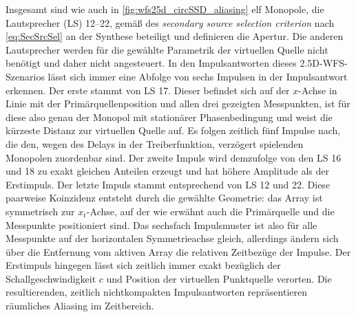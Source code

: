 Insgesamt sind wie auch in \Abb\ref{fig:wfs25d_circSSD_aliasing} elf Monopole, die
Lautsprecher (LS) 12--22, gemäß des \textit{secondary source selection criterion}
nach \Glg\eqref{eq:SecSrcSel} an der Synthese beteiligt und definieren die Apertur.
%
Die anderen Lautsprecher werden für die gewählte Parametrik der virtuellen Quelle
nicht benötigt und daher nicht angesteuert.
%
In den Impulsantworten dieses 2.5D-WFS-Szenarios lässt sich immer eine Abfolge von
sechs Impulsen in der Impulsantwort erkennen.
%
Der erste stammt von LS 17.
%
Dieser befindet sich auf der $x$-Achse in Linie mit der
Primärquellenposition und allen drei gezeigten Messpunkten, ist für diese also
genau der Monopol mit stationärer Phasenbedingung und weist die kürzeste
Distanz zur virtuellen Quelle auf.
%
Es folgen zeitlich fünf Impulse nach, die den, wegen des Delays in der
Treiberfunktion, verzögert spielenden Monopolen zuordenbar sind.
%
Der zweite Impuls wird demzufolge von den LS 16 und 18 zu exakt gleichen
Anteilen erzeugt und hat höhere Amplitude als der Erstimpuls.
%
Der letzte Impuls stammt entsprechend von LS 12 und 22.
%
Diese paarweise Koinzidenz entsteht durch die gewählte Geometrie:
%
das Array ist symmetrisch zur $x_\mathrm{r}$-Achse, auf der wie
erwähnt auch die Primärquelle und die Messpunkte positioniert sind.
%
Das sechsfach Impulsmuster ist also für alle Messpunkte auf der
horizontalen Symmetrieachse gleich, allerdings ändern sich über die
Entfernung vom aktiven Array die relativen Zeitbezüge der Impulse.
%
Der Erstimpuls hingegen lässt sich zeitlich immer exakt bezüglich der
Schallgeschwindigkeit $c$ und Position der virtuellen Punktquelle
verorten.
%
Die resultierenden, zeitlich nichtkompakten Impulsantworten repräsentieren
räumliches Aliasing im Zeitbereich.
%
%
%
